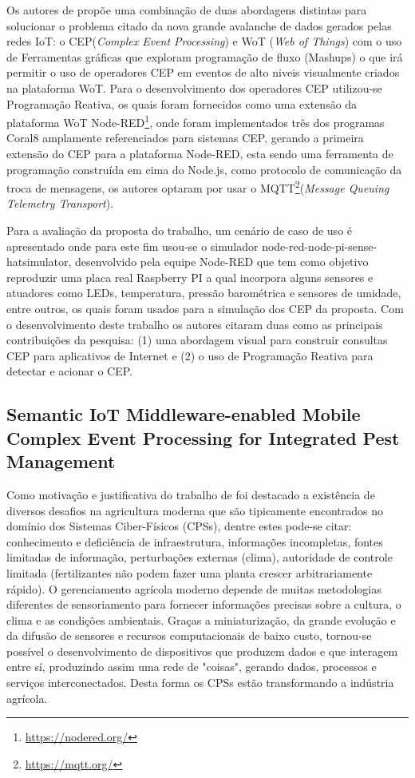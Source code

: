 \documentclass[ti,table]{texufpel} %
\begin{document}
	Os autores de \cite{art2zimmerle2018web} propõe uma combinação de duas abordagens distintas para solucionar o problema citado da nova grande avalanche de dados gerados pelas redes IoT: o CEP(\textit{Complex Event Processing}) e WoT (\textit{Web of Things}) com o uso de Ferramentas gráficas que exploram programação de fluxo (Mashups) o que irá permitir o uso de operadores CEP em eventos de alto niveis visualmente criados na plataforma WoT.
	Para o desenvolvimento dos operadores CEP utilizou-se Programação Reativa, os quais foram fornecidos como uma extensão da plataforma WoT Node-RED\footnote{\url{https://nodered.org/}}, onde foram implementados três dos programas Coral8 amplamente referenciados para sistemas CEP, gerando a primeira extensão do CEP para a plataforma Node-RED, esta sendo uma ferramenta de programação construída em cima do Node.js, como protocolo de comunicação da troca de mensagens, os autores optaram por usar o MQTT\footnote{\url{https://mqtt.org/}}(\textit{Message Queuing Telemetry Transport}). 	
	
	Para a avaliação da proposta do trabalho, um cenário de caso de uso é apresentado onde para este fim usou-se o simulador node-red-node-pi-sense-hatsimulator, desenvolvido pela equipe Node-RED que tem como objetivo reproduzir uma placa real Raspberry PI a qual incorpora alguns sensores e atuadores como LEDs, temperatura, pressão barométrica e sensores de umidade, entre outros, os quais foram usados para a simulação dos CEP da proposta. Com o desenvolvimento deste trabalho os autores citaram duas como as principais contribuições da pesquisa: (1) uma abordagem visual para construir consultas CEP para aplicativos de Internet e (2) o uso de Programação Reativa para detectar e acionar o CEP.

\subsection{Semantic IoT Middleware-enabled Mobile Complex Event Processing for Integrated Pest Management}


	Como motivação e justificativa do trabalho de \cite{art3nocera2017semantic} foi destacado a existência de diversos desafios na agricultura moderna que são tipicamente encontrados no domínio dos Sistemas Ciber-Físicos (CPSs), dentre estes pode-se citar: conhecimento e deficiência de infraestrutura, informações incompletas, fontes limitadas de informação, perturbações externas (clima), autoridade de controle limitada (fertilizantes não podem fazer uma planta crescer arbitrariamente rápido). O gerenciamento agrícola moderno depende  de muitas metodologias diferentes de sensoriamento para fornecer informações precisas sobre a cultura, o clima e as condições ambientais. Graças a miniaturização, da grande evolução e da difusão de sensores e recursos computacionais de baixo custo, tornou-se possível o desenvolvimento de dispositivos que produzem dados e que interagem entre sí, produzindo assim uma rede de "coisas", gerando dados, processos e serviços interconectados. Desta forma os CPSs estão transformando a indústria agrícola.
	
\end{document}
